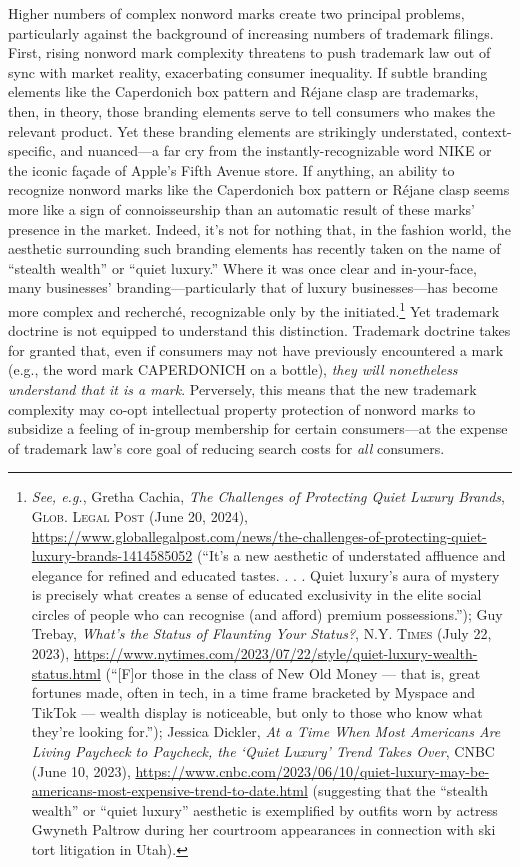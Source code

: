 \documentclass[letterpaper, 11pt, oneside]{article}
\begin{document}
Higher numbers of complex nonword marks create two principal problems, particularly against the background of increasing numbers of trademark filings. First, rising nonword mark complexity threatens to push trademark law out of sync with market reality, exacerbating consumer inequality. If subtle branding elements like the Caperdonich box pattern and Réjane clasp are trademarks, then, in theory, those branding elements serve to tell consumers who makes the relevant product. Yet these branding elements are strikingly understated, context-specific, and nuanced—a far cry from the instantly-recognizable word NIKE or the iconic façade of Apple's Fifth Avenue store. If anything, an ability to recognize nonword marks like the Caperdonich box pattern or Réjane clasp seems more like a sign of connoisseurship than an automatic result of these marks' presence in the market. Indeed, it's not for nothing that, in the fashion world, the aesthetic surrounding such branding elements has recently taken on the name of ``stealth wealth'' or ``quiet luxury.'' Where it was once clear and in-your-face, many businesses' branding—particularly that of luxury businesses—has become more complex and recherché, recognizable only by the initiated.\footnote{\textit{See, e.g.}, Gretha Cachia, \textit{The Challenges of Protecting Quiet Luxury Brands}, \textsc{Glob. Legal Post} (June 20, 2024), \url{https://www.globallegalpost.com/news/the-challenges-of-protecting-quiet-luxury-brands-1414585052} (``It’s a new aesthetic of understated affluence and elegance for refined and educated tastes. . . . Quiet luxury’s aura of mystery is precisely what creates a sense of educated exclusivity in the elite social circles of people who can recognise (and afford) premium possessions.''); Guy Trebay, \textit{What's the Status of Flaunting Your Status?}, \textsc{N.Y. Times} (July 22, 2023), \url{https://www.nytimes.com/2023/07/22/style/quiet-luxury-wealth-status.html} (``[F]or those in the class of New Old Money — that is, great fortunes made, often in tech, in a time frame bracketed by Myspace and TikTok — wealth display is noticeable, but only to those who know what they’re looking for.''); Jessica Dickler, \textit{At a Time When Most Americans Are Living Paycheck to Paycheck, the ‘Quiet Luxury’ Trend Takes Over}, CNBC (June 10, 2023), \url{https://www.cnbc.com/2023/06/10/quiet-luxury-may-be-americans-most-expensive-trend-to-date.html} (suggesting that the ``stealth wealth'' or ``quiet luxury'' aesthetic is exemplified by outfits worn by actress Gwyneth Paltrow during her courtroom appearances in connection with ski tort litigation in Utah).} Yet trademark doctrine is not equipped to understand this distinction. Trademark doctrine takes for granted that, even if consumers may not have previously encountered a mark (e.g., the word mark CAPERDONICH on a bottle), \textit{they will nonetheless understand that it is a mark}. Perversely, this means that the new trademark complexity may co-opt intellectual property protection of nonword marks to subsidize a feeling of in-group membership for certain consumers—at the expense of trademark law's core goal of reducing search costs for \textit{all} consumers.
\end{document}
